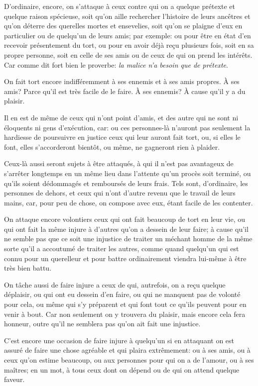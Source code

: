D'ordinaire, encore, on s'attaque à ceux contre qui on a quelque prétexte et quelque raison spécieuse, soit qu'on
aille rechercher l'histoire de leurs ancêtres et qu'on déterre des querelles mortes et ensevelies, soit qu'on se
plaigne d'eux en particulier ou de quelqu'un de leurs amis; par exemple: ou pour être en état d'en recevoir
présentement du tort, ou pour en avoir déjà reçu plusieurs fois, soit en sa propre personne, soit en celle de ses
amis ou de ceux de qui on prend les intérêts. Car comme dit fort bien le proverbe: \emph{la malice n'a besoin que
de prétexte}.

On fait tort encore indifféremment à ses ennemis et à ses amis propres. À ses amis? Parce qu'il est très facile de
le faire. À ses ennemis? À cause qu'il y a du plaisir.

Il en est de même de ceux qui n'ont point d'amis, et des autre qui ne sont ni éloquents ni gens d'exécution, car:
ou ces personnes-là n'auront pas seulement la hardiesse de poursuivre en justice ceux qui leur auront fait tort,
ou, si elles le font, elles s'accorderont bientôt, ou même, ne gagneront rien à plaider.

Ceux-là aussi seront sujets à être attaqués, à qui il n'est pas avantageux de s'arrêter longtemps en un même lieu
dans l'attente qu'un procès soit terminé, ou qu'ils soient dédommagés et remboursés de leurs frais. Tels sont,
d'ordinaire, les personnes de dehors, et ceux qui n'ont d'autre revenu que le travail de leurs mains, car, pour
peu de chose, on compose avec eux, étant facile de les contenter.

On attaque encore volontiers ceux qui ont fait beaucoup de tort en leur vie, ou qui ont fait la même injure à
d'autres qu'on a dessein de leur faire; à cause qu'il ne semble pas que ce soit une injustice de traiter un méchant
homme de la même sorte qu'il a accoutumé de traiter les autres, comme quand quelqu'un qui est connu pour un
querelleur et pour battre ordinairement viendra lui-même à être très bien battu.

On tâche aussi de faire injure a ceux de qui, autrefois, on a reçu quelque déplaisir, ou qui ont eu dessein d'en
faire, ou qui ne manquent pas de volonté pour cela, ou même qui s'y préparent et qui font tout ce qu'ils peuvent
pour en venir à bout. Car non seulement on y trouvera du plaisir, mais encore cela fera honneur, outre qu'il ne
semblera pas qu'on ait fait une injustice.

C'est encore une occasion de faire injure à quelqu'un si en attaquant on est assuré de faire une chose agréable
et qui plaira extrêmement: ou à ses amis, ou à ceux qu'on estime beaucoup, ou aux personnes pour qui on a de
l'amour, ou à ses maîtres; en un mot, à tous ceux dont on dépend ou de qui on attend quelque faveur.


